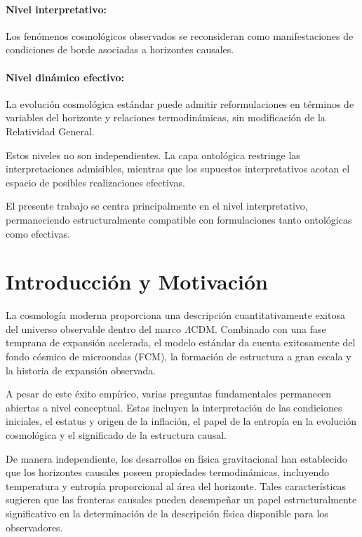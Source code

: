 \documentclass[12pt,a4paper]{article}
\begin{document}
\paragraph{Nivel interpretativo:} Los fenómenos cosmológicos observados se reconsideran como manifestaciones de condiciones de borde asociadas a horizontes causales.

\paragraph{Nivel dinámico efectivo:} La evolución cosmológica estándar puede admitir reformulaciones en términos de variables del horizonte y relaciones termodinámicas, sin modificación de la Relatividad General.

Estos niveles no son independientes. La capa ontológica restringe las interpretaciones admisibles, mientras que los supuestos interpretativos acotan el espacio de posibles realizaciones efectivas.

El presente trabajo se centra principalmente en el nivel interpretativo, permaneciendo estructuralmente compatible con formulaciones tanto ontológicas como efectivas.

\section{Introducción y Motivación}

La cosmología moderna proporciona una descripción cuantitativamente exitosa del universo observable dentro del marco $\Lambda$CDM. Combinado con una fase temprana de expansión acelerada, el modelo estándar da cuenta exitosamente del fondo cósmico de microondas (FCM), la formación de estructura a gran escala y la historia de expansión observada.

A pesar de este éxito empírico, varias preguntas fundamentales permanecen abiertas a nivel conceptual. Estas incluyen la interpretación de las condiciones iniciales, el estatus y origen de la inflación, el papel de la entropía en la evolución cosmológica y el significado de la estructura causal.

De manera independiente, los desarrollos en física gravitacional han establecido que los horizontes causales poseen propiedades termodinámicas, incluyendo temperatura y entropía proporcional al área del horizonte. Tales características sugieren que las fronteras causales pueden desempeñar un papel estructuralmente significativo en la determinación de la descripción física disponible para los observadores.
\end{document}
